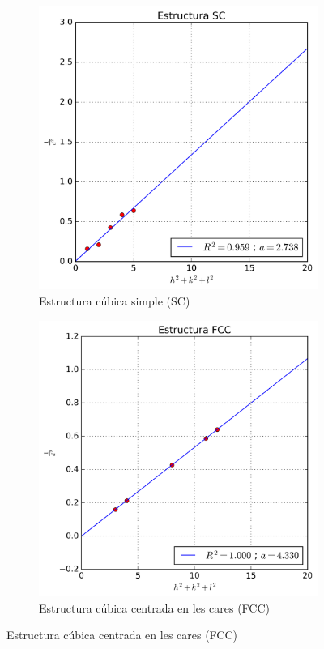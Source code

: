 \documentclass[a4paper, 11pt]{article}
\begin{document}
\begin{figure}[htbp]
  \centering

  \begin{subfigure}[b]{0.48\textwidth}
    \centering
    \includegraphics[width=\linewidth]{images/SC.png}
    \caption{Estructura cúbica simple (SC)}
    \label{fig:1}
  \end{subfigure}
  \hfill
  \begin{subfigure}[b]{0.48\textwidth}
    \centering
    \includegraphics[width=\linewidth]{images/FCC.png}
    \caption{Estructura cúbica centrada en les cares (FCC)}
    \label{fig:2}
  \end{subfigure}


\end{figure}
\end{document}
